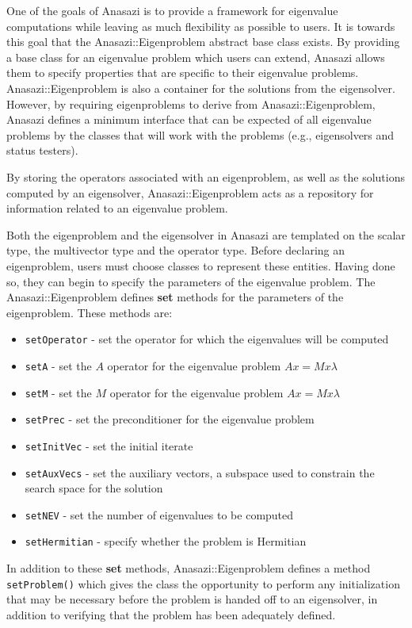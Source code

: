 One of the goals of Anasazi is to provide a framework for eigenvalue
computations while leaving as much flexibility as possible to users. It is towards
this goal that the Anasazi::Eigenproblem abstract base class exists. By
providing a base class for an eigenvalue problem which users can extend, Anasazi
allows them to specify properties that are specific to their eigenvalue
problems. Anasazi::Eigenproblem is also a container for the solutions
from the eigensolver. However, by requiring eigenproblems to derive from
Anasazi::Eigenproblem, Anasazi defines a minimum interface that can be
expected of all eigenvalue problems by the classes that will work with the
problems (e.g., eigensolvers and status testers).

By storing the operators associated with an eigenproblem, as well as the
solutions computed by an eigensolver, Anasazi::Eigenproblem acts as a
repository for information related to an eigenvalue problem. 

Both the eigenproblem and the eigensolver in Anasazi are templated 
on the scalar type, the multivector type and the operator type. Before
declaring an eigenproblem, users must choose classes to represent these
entities. Having done so, they can begin to specify the parameters of the
eigenvalue problem. The Anasazi::Eigenproblem defines \textbf{set} methods for
the parameters of the eigenproblem. These methods are:
\begin{itemize}
\item \verb!setOperator! - set the operator for which the eigenvalues will be computed
\item \verb!setA! - set the $A$ operator for the eigenvalue problem $A x = M x \lambda$
\item \verb!setM! - set the $M$ operator for the eigenvalue problem $A x = M x \lambda$
\item \verb!setPrec! - set the preconditioner for the eigenvalue problem
\item \verb!setInitVec! - set the initial iterate
\item \verb!setAuxVecs! - set the auxiliary vectors, a subspace used to constrain the
  search space for the solution
\item \verb!setNEV! - set the number of eigenvalues to be computed
\item \verb!setHermitian! - specify whether the problem is Hermitian
\end{itemize}
In addition to these \textbf{set} methods, Anasazi::Eigenproblem defines
a method \verb!setProblem()! which gives the class the opportunity to perform
any initialization that may be necessary before the problem is handed off to an
eigensolver, in addition to verifying that the problem has been adequately defined. 

